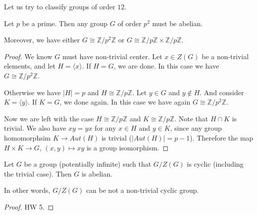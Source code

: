 Let us try to classify groups of order $12$.

\begin{lem}
    Let $p$ be a prime. Then any group $G$ of order $p^2$ must be abelian.

    Moreover, we have either $G \cong \mathbb{Z}/p^2 \mathbb{Z}$ or $G \cong \mathbb{Z}/p\mathbb{Z} \times \mathbb{Z}/p\mathbb{Z}$.
\end{lem}

\begin{proof}
    We know $G$ must have non-trivial center. Let $x \in Z(G)$ be a non-trivial elements, and let $H = \langle x \rangle$. If $H = G$, we are done. In this case we have $G \cong  \mathbb{Z}/p^2 \mathbb{Z}$.

    Otherwise we have $|H| = p$ and $H \cong \mathbb{Z}/p\mathbb{Z}$. Let $y \in G$ and $ y\notin H$. And consider $K = \langle y \rangle$. If $K  =G$, we done again. In this case we have again $G \cong  \mathbb{Z}/p^2 \mathbb{Z}$.

    Now we are left with the case $H \cong \mathbb{Z}/p\mathbb{Z}$ and $K \cong \mathbb{Z}/p\mathbb{Z}$. Note that $H \cap K$ is trivial. We also have $xy = yx$ for any $x \in H$ and $y \in K$, since any group homomorphsim $K \rightarrow Aut(H)$ is trivial ($|Aut(H)|= p-1$). Therefore the map $H \times K \rightarrow G$, $(x, y) \mapsto xy$ is a group isomorphism.
\end{proof}

\begin{lem}
    Let $G$ be a group (potentially infinite) such that $G/Z(G)$ is cyclic (including the trivial case). Then $G$ is abelian.

    In other words, $G/Z(G)$ can be not a non-trivial cyclic group.
\end{lem}
\begin{proof}
    HW 5.
\end{proof}

